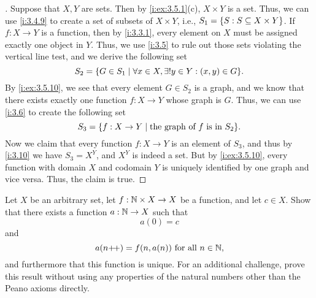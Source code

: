 \begin{proof}[]
  Suppose that \(X, Y\) are sets.
  Then by \cref{i:ex:3.5.1}(c), \(X \times Y\) is a set.
  Thus, we can use \cref{i:3.4.9} to create a set of subsets of \(X \times Y\), i.e., \(S_1 = \left\lbrace S : S \subseteq X \times Y\right\rbrace\).
  If \(f : X \to Y\) is a function, then by \cref{i:3.3.1}, every element on \(X\) must be assigned exactly one object in \(Y\).
  Thus, we use \cref{i:3.5} to rule out those sets violating the vertical line test, and we derive the following set
  \[
    S_2 = \set{G \in S_1 \mid \forall x \in X, \exists! y \in Y : (x, y) \in G}.
  \]
  By \cref{i:ex:3.5.10}, we see that every element \(G \in S_2\) is a graph, and we know that there exists exactly one function \(f : X \to Y\) whose graph is \(G\).
  Thus, we can use \cref{i:3.6} to create the following set
  \[
    S_3 = \set{f : X \to Y \mid \text{the graph of } f \text{ is in } S_2}.
  \]
  Now we claim that every function \(f : X \to Y\) is an element of \(S_3\), and thus by \cref{i:3.10} we have \(S_3 = X^Y\), and \(X^Y\) is indeed a set.
  But by \cref{i:ex:3.5.10}, every function with domain \(X\) and codomain \(Y\) is uniquely identified by one graph and vice versa.
  Thus, the claim is true.
\end{proof}

\begin{ex}\label{i:ex:3.5.12}
  Let \(X\) be an arbitrary set, let \(f : \mathbb{N} \times X \to X\) be a function, and let \(c \in X\).
  Show that there exists a function \(a : \mathbb{N} \to X\) such that
  \[
    a(0) = c
  \]
  and
  \[
    a(n{+}\!{+}) = f(n, a(n)) \text{ for all } n \in \mathbb{N},
  \]
  and furthermore that this function is unique.
  For an additional challenge, prove this result without using any properties of the natural numbers other than the Peano axioms directly.
\end{ex}

